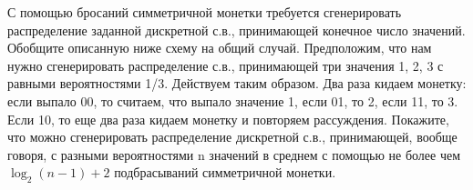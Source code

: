 \begin{comment}
\begin{problem}
Как с помощью с.в. $\xi $, равномерно распределенной на отрезке $\left[0,1\right]$ ($\xi \in R\left[0;1\right]$), и симметричной монетки построить с.в. $X$, имеющую плотность распределения $f_{X} (x)=\frac{1}{4} \left(\frac{1}{\sqrt{x} } +\frac{1}{\sqrt{1-x} } \right)$, $x\in \left[0,1\right]$?
\end{problem}

\begin{problem}[Метод фон Неймана] 

Пусть с.в. $\xi $ распределена на отрезке$\left[a,b\right]$, причем ее плотность распределения ограничена: $\mathop{\max }\limits_{x\in \left[a;b\right]} f_{\xi } (x)=C<\infty $. Пусть с.в. $\eta _{1} $, $\eta _{2} $, \dots  -- независимы и равномерно распределены на $\left[0,1\right]$, $X_{i} =a+\left(b-a\right)\eta _{2i-1} $, $Y_{i} =C\eta _{2i} $, $i=1,2,...$, т.е. пары $\left(X_{i} ,Y_{i} \right)$ независимы и равномерно распределены в прямоугольнике $\left[a,b\right]\times \left[0,C\right]$. Обозначим через $\nu $ номер первой точки с координатами $\left(X_{i} ,Y_{i} \right)$, попавшей под график плотности $f_{\xi } (x)$, т.е. $\nu =\min \left\{i:\quad Y_{i} \le f_{\xi } (X_{i} )\right\}$. Положим $X_{\nu } =\sum _{n=1}^{\infty }X_{n} I\left\{\nu =n\right\} $.

\begin{enumerate}
\item Покажите, что с.в. $X_{\nu } $ распределена также как $\xi $.

\item Сколько в среднем точек $\left(X_{i} ,Y_{i} \right)$ потребуется «вбросить» в прямоугольник $\left[a,b\right]\times \left[0,C\right]$ для получения одного значения $\xi $?

\item Предложите модификацию рассмотренного метода для генерации дискретной случайной величины, принимающей значения $\lbrace 1, 2, ... , k \rbrace$ с одинаковой вероятностью, имея в распоряжении монету (генератор бинарной случайной величины).   
\end{enumerate}
\end{problem}
\end{comment}

\begin{problem}
С помощью бросаний симметричной монетки требуется сгенерировать распределение заданной дискретной с.в., принимающей конечное число значений. Обобщите описанную ниже схему на общий случай. Предположим, что нам нужно сгенерировать распределение с.в., принимающей три значения 1, 2, 3 с равными вероятностями 1/3. Действуем таким образом. Два раза кидаем монетку: если выпало 00, то считаем, что выпало значение 1, если 01, то 2, если 11, то 3. Если 10, то еще два раза кидаем монетку и повторяем рассуждения. Покажите, что можно сгенерировать распределение дискретной с.в., принимающей, вообще говоря, с разными вероятностями n значений в среднем с помощью не более чем $\log_2 (n - 1) + 2$ подбрасываний симметричной монетки.
\end{problem}

